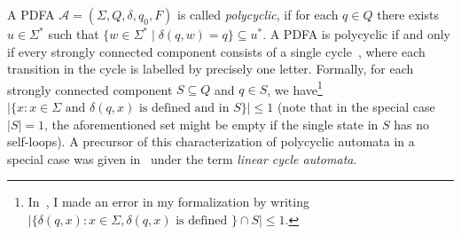 A PDFA $\mathcal A=(\Sigma, Q, \delta, q_0, F)$
is called \emph{polycyclic}, if for each $q \in Q$
there exists $u \in \Sigma^*$ such that
$\{ w \in \Sigma^* \mid \delta(q, w) = q \} \subseteq u^*$. %
A PDFA is polycyclic if and only if every strongly connected
component consists of a single cycle~\cite[Proposition 3]{DBLP:conf/ictcs/Hoffmann20}, where each transition in the cycle is labelled by precisely one
letter. %
Formally, %
for each strongly connected component $S \subseteq Q$ 
and $q \in S$, we
have\footnote{In~\cite{DBLP:conf/ictcs/Hoffmann20}, I made an error in my formalization
by writing
$|\{ \delta(q, x) : x \in \Sigma, \delta(q, x) \mbox{ is defined } \} \cap S| \le 1$.} %
$|\{ x : x \in \Sigma \mbox{ and } \delta(q, x) \mbox{ is defined and in $S$} \}| \le 1$ (note that in the special case $|S| = 1$, the aforementioned set might be empty if the single state in $S$ has no self-loops).
A precursor of this characterization of polycyclic automata in
a special case was given in~\cite{DBLP:conf/stacs/GanardiHKLM18}
under the term \emph{linear cycle automata}.

